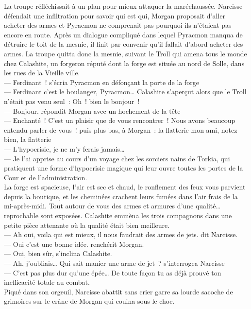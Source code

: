 \documentclass[french, a4paper, 12pt]{article}
\begin{document}
La troupe réfléchissait à un plan pour mieux attaquer la maréchaussée. Narcisse défendait une infiltration pour savoir qui est qui, Morgan proposait d'aller acheter des armes et Pyracmon ne comprenait pas pourquoi ils n'étaient pas encore en route. Après un dialogue compliqué dans lequel Pyracmon manqua de détruire le toit de la mesnie, il finit par convenir qu'il fallait d'abord acheter des armes. La troupe quitta donc la mesnie, suivant le Troll qui amena tous le monde chez Calashite, un forgeron réputé dont la forge est située au nord de Solle, dans les rues de la Vieille ville.\\
--- Ferdinant~! s'écria Pyracmon en défonçant la porte de la forge\\
--- Ferdinant c'est le boulanger, Pyracmon… Calashite s'aperçut alors que le Troll n'était pas venu seul~: Oh~! bien le bonjour~!\\
--- Bonjour. répondit Morgan avec un hochement de la tête\\
--- Enchanté~! C'est un plaisir que de vous rencontrer~! Nous avons beaucoup entendu parler de vous~! puis plus bas, à Morgan~: la flatterie mon ami, notez bien, la flatterie \\
--- L'hypocrisie, je ne m'y ferais jamais…\\
--- Je l'ai apprise au cours d'un voyage chez les sorciers nains de Torkia, qui pratiquent une forme d'hypocrisie magique qui leur ouvre toutes les portes de la Cour et de l'administration.\\
La forge est spacieuse, l'air est sec et chaud, le ronflement des feux vous parvient depuis la boutique, et les cheminées crachent leurs fumées dans l'air frais de la mi-après-midi. Tout autour de vous des armes et armures d'une qualité… reprochable sont exposées. Calashite emmèna les trois compagnons dans une petite pièce attenante où la qualité était bien meilleure.\\
--- Ah oui, voila qui est mieux, il nous faudrait des armes de jets. dit Narcisse.\\
--- Oui c'est une bonne idée. renchérit Morgan.\\
--- Oui, bien sûr, s'inclina Calashite.\\
--- Ah, j'oubliais… Qui sait manier une arme de jet~? s'interrogea Narcisse\\
--- C'est pas plus dur qu'une épée… De toute façon tu as déjà prouvé ton inefficacité totale au combat.\\
Piqué dans son orgeuil, Narcisse abattit sans crier garre sa lourde sacoche de grimoires sur le crâne de Morgan qui couina sous le choc.
\end{document}
